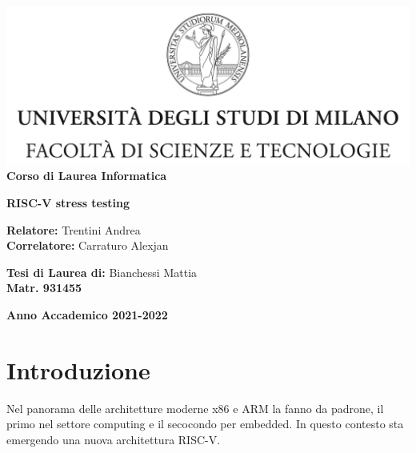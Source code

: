 \documentclass[12pt, a4paper]{report}
\begin{document}
\begin{titlepage}
\begin{center}
\includegraphics[width=\textwidth]{Img/Logo.jpg}\\
{\large{\bf Corso di Laurea Informatica}}
\end{center}
\vspace{12mm}
\begin{center}

\vspace{4mm}
{\huge{\bf RISC-V stress testing}}\\
\vspace{4mm}

\end{center}
\vspace{12mm}
\begin{flushleft}
{\large{\bf Relatore:}}
{\large{Trentini Andrea}}\\
\vspace{4mm}
{\large{\bf Correlatore:}}
{\large{Carraturo Alexjan}}\\
\end{flushleft}
\vspace{12mm}
\begin{flushright}
{\large{\bf Tesi di Laurea di:}}
{\large{Bianchessi Mattia}}\\
{\large{\bf Matr. 931455}}\\
\end{flushright}
\vspace{4mm}
\begin{center}
{\large{\bf Anno Accademico 2021-2022}}
\end{center}
\end{titlepage}


\listoftodos


\tableofcontents
\listoffigures
\listoftables
\lstlistoflistings



\chapter*{Introduzione}
Nel panorama delle architetture moderne x86 e ARM la fanno da padrone, il primo nel settore computing e il secocondo per embedded. In questo contesto sta emergendo una nuova architettura RISC-V. 
\end{document}
